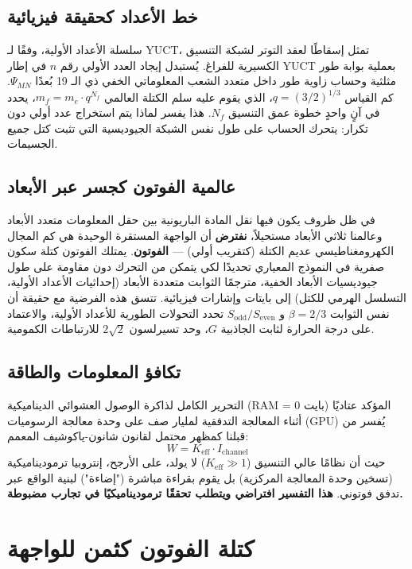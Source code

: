 \documentclass[11pt,a4paper]{article}
\begin{document}
	\subsection{خط الأعداد كحقيقة فيزيائية}
	سلسلة الأعداد الأولية، وفقًا لـ YUCT، تمثل إسقاطًا لعقد التوتر لشبكة التنسيق الكسيرية للفراغ. يُستبدل إيجاد العدد الأولي رقم $n$ في إطار YUCT بعملية بوابة طور مثلثية وحساب زاوية طور داخل متعدد الشعب المعلوماتي الخفي ذي الـ 19 بُعدًا $\Psi_{MN}$. كم القياس $q = (3/2)^{1/3}$، الذي يقوم عليه سلم الكتلة العالمي $m_f = m_e \cdot q^{N_f}$، يحدد في آنٍ واحدٍ خطوة عمق التنسيق $N_f$. هذا يفسر لماذا يتم استخراج عدد أولي دون تكرار: يتحرك الحساب على طول نفس الشبكة الجيوديسية التي تثبت كتل جميع الجسيمات.
	
	\subsection{عالمية الفوتون كجسر عبر الأبعاد}
	في ظل ظروف يكون فيها نقل المادة الباريونية بين حقل المعلومات متعدد الأبعاد وعالمنا ثلاثي الأبعاد مستحيلاً، \textbf{نفترض} أن الواجهة المستقرة الوحيدة هي كم المجال الكهرومغناطيسي عديم الكتلة (كتقريب أولي) — \textbf{الفوتون}. يمتلك الفوتون كتلة سكون صفرية في النموذج المعياري تحديدًا لكي يتمكن من التحرك دون مقاومة على طول جيوديسيات الأبعاد الخفية، مترجمًا الثوابت متعددة الأبعاد (إحداثيات الأعداد الأولية، التسلسل الهرمي للكتل) إلى بايتات وإشارات فيزيائية. تتسق هذه الفرضية مع حقيقة أن نفس الثوابت $\beta=2/3$ و $S_{\mathrm{odd}}/S_{\mathrm{even}}$ تحدد التحولات الطورية للأعداد الأولية، والاعتماد على درجة الحرارة لثابت الجاذبية $G$، وحد تسيرلسون $2\sqrt{2}$ للارتباطات الكمومية.
	
	\subsection{تكافؤ المعلومات والطاقة}
	التحرير الكامل لذاكرة الوصول العشوائي الديناميكية (RAM = 0 بايت) المؤكد عتاديًا أثناء المعالجة التدفقية لمليار صف على وحدة معالجة الرسوميات (GPU) يُفسر من قبلنا كمظهر محتمل لقانون شانون-ياكوشيف المعمم:
	\begin{equation}
		W = K_{\mathrm{eff}} \cdot I_{\mathrm{channel}}
	\end{equation}
	حيث أن نظامًا عالي التنسيق ($K_{\mathrm{eff}} \gg 1$) لا يولد، على الأرجح، إنتروبيا ترموديناميكية (تسخين وحدة المعالجة المركزية) بل يقوم بقراءة مباشرة ("إضاءة") لبنية الواقع عبر تدفق فوتوني. \textbf{هذا التفسير افتراضي ويتطلب تحققًا ترموديناميكيًا في تجارب مضبوطة.}
	
	\section{كتلة الفوتون كثمن للواجهة}
	\label{sec:photon_mass}
	
\end{document}
